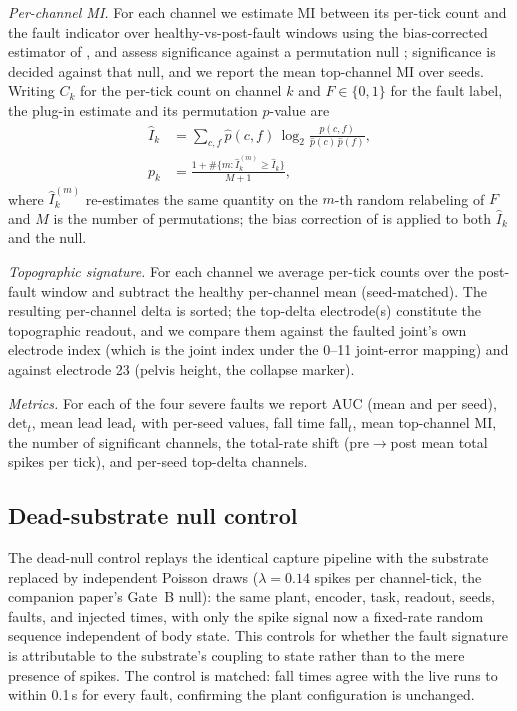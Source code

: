 \emph{Per-channel MI.} For each channel we estimate MI between its per-tick
count and the fault indicator over healthy-vs-post-fault windows using the
bias-corrected estimator of \cite{kraskov2004, panzeri2007},
and assess significance against a permutation null
\cite{theiler1992, ernst2004}; significance is decided against that
null, and we report the mean top-channel MI over seeds. Writing $C_k$ for the
per-tick count on channel $k$ and $F \in \{0,1\}$ for the fault label, the
plug-in estimate and its permutation $p$-value are
\begin{equation}
\begin{aligned}
\hat I_k &= \sum_{c,f} \hat p(c,f)\,\log_2
\frac{\hat p(c,f)}{\hat p(c)\,\hat p(f)},\\
p_k &= \frac{1 + \#\{m : \hat I_k^{(m)} \ge \hat I_k\}}{M+1},
\end{aligned}
\end{equation}
where $\hat I_k^{(m)}$ re-estimates the same quantity on the $m$-th random
relabeling of $F$ and $M$ is the number of permutations; the bias correction of
\cite{panzeri2007} is applied to both $\hat I_k$ and the null.

\emph{Topographic signature.} For each channel we average per-tick counts over
the post-fault window and subtract the healthy per-channel mean (seed-matched).
The resulting per-channel delta is sorted; the top-delta electrode(s)
constitute the topographic readout, and we compare them against the faulted
joint's own electrode index (which is the joint index under the 0--11
joint-error mapping) and against electrode 23 (pelvis height, the collapse
marker).

\emph{Metrics.} For each of the four severe faults we report AUC (mean and per
seed), $\mathrm{det}_t$, mean lead $\mathrm{lead}_t$ with per-seed values, fall
time $\mathrm{fall}_t$, mean top-channel MI, the number of significant
channels, the total-rate shift (pre$\rightarrow$post mean total spikes per
tick), and per-seed top-delta channels.

\subsection{Dead-substrate null control}

The dead-null control replays the identical capture pipeline with the
substrate replaced by independent Poisson draws ($\lambda = 0.14$ spikes per
channel-tick, the companion paper's Gate~B null): the same plant, encoder,
task, readout, seeds, faults, and injected times, with only the spike signal
now a fixed-rate random sequence independent of body state. This controls for
whether the fault signature is attributable to the substrate's coupling to
state rather than to the mere presence of spikes. The control is matched:
fall times agree with the live runs to within 0.1\,s for every fault,
confirming the plant configuration is unchanged.


